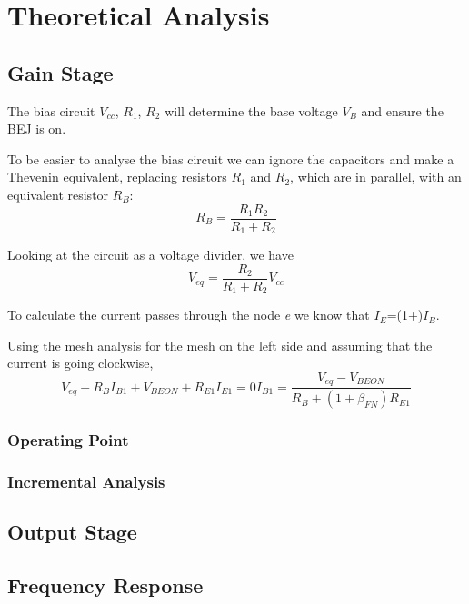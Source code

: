 \section{Theoretical Analysis} \label{sec:analysis}
 


\subsection{Gain Stage}
The bias circuit $V_{cc}$, $R_1$, $R_2$ will determine the base voltage $V_B$ and ensure the BEJ is on.

To be easier to analyse the bias circuit we can ignore the capacitors and make a Thevenin equivalent, replacing resistors $R_{1}$ and $R_{2}$, which are in parallel, with an equivalent resistor $R_{B}$:
\begin{equation}
R_B = \frac{R_{1} R_{2}}{R_{1}+R_{2}}
\end{equation}

Looking at the circuit as a voltage divider, we have
\begin{equation}
V_{eq} = \frac{R_{2}}{R_{1}+R_{2}} V_{cc}
\end{equation}

To calculate the current passes through the node \textit{e} we know that $I_E$=(1+\beta)$I_B$.

Using the mesh analysis for the mesh on the left side and assuming that the current is going clockwise,
\begin{equation}
V_{eq} + R_B I_{B1} + V_{BEON} + R_{E1} I_{E1} = 0
I_{B1} = \frac{V_{eq}-V_{BEON}}{R_B + (1+\beta_{FN}) R_{E1}}
\end{equation}


\subsubsection{Operating Point}
\subsubsection{Incremental Analysis}
\subsection{Output Stage}

\subsection{Frequency Response}









